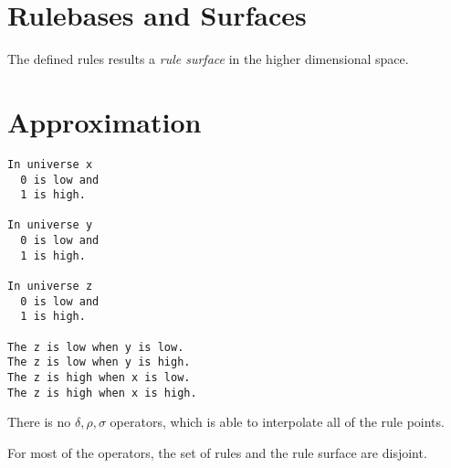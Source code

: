 \documentclass[a4paper,12pt]{article}
\begin{document}
\section{Rulebases and Surfaces}

The defined rules results a \textit{rule surface} in the higher dimensional space.




\pagebreak

\section{Approximation}

\begin{verbatim}
In universe x
  0 is low and
  1 is high.

In universe y
  0 is low and
  1 is high.

In universe z
  0 is low and
  1 is high.

The z is low when y is low.
The z is low when y is high.
The z is high when x is low.
The z is high when x is high.
\end{verbatim}

There is no $\delta, \rho, \sigma$ operators, which is able to interpolate all of the rule points.

For most of the operators, the set of rules and the rule surface are disjoint.
\end{document}
